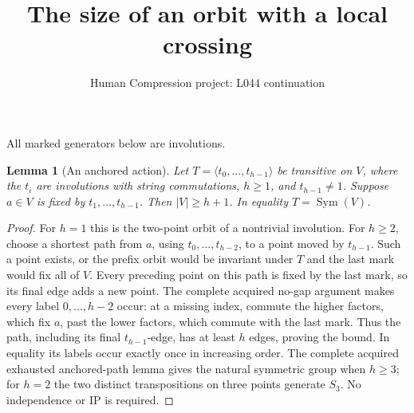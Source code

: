 \documentclass[11pt,a4paper]{article}
\title{The size of an orbit with a local crossing}
\author{Human Compression project: L044 continuation}
\date{}
\newtheorem{lemma}{Lemma}
\newcommand{\gen}[1]{\langle#1\rangle}
\newcommand{\Sym}{\operatorname{Sym}}
\begin{document}
\maketitle
All marked generators below are involutions.
\begin{lemma}[An anchored action]
Let $T=\gen{t_0,\ldots,t_{h-1}}$ be transitive on $V$,
where the $t_i$ are involutions with string commutations,
$h\ge1$, and $t_{h-1}\ne1$.
Suppose $a\in V$ is fixed by $t_1,\ldots,t_{h-1}$.
Then $|V|\ge h+1$. In equality $T=\Sym(V)$.
\end{lemma}
\begin{proof}
For $h=1$ this is the two-point orbit of a nontrivial
involution. For $h\ge2$, choose a shortest path from
$a$, using $t_0,\ldots,t_{h-2}$, to a point moved
by $t_{h-1}$. Such a point exists, or the prefix
orbit would be invariant under $T$ and the last
mark would fix all of $V$. Every preceding point
on this path is fixed by the last mark, so its
final edge adds a new point. The complete acquired
no-gap argument makes every label $0,\ldots,h-2$
occur: at a missing index, commute the higher
factors, which fix $a$, past the lower factors,
which commute with the last mark. Thus the path,
including its final $t_{h-1}$-edge, has at least
$h$ edges, proving the bound.
In equality its labels occur exactly once in
increasing order. The complete acquired exhausted
anchored-path lemma gives the natural symmetric
group when $h\ge3$; for $h=2$ the two distinct
transpositions on three points generate $S_3$.
No independence or IP is required.
\end{proof}
\end{document}
